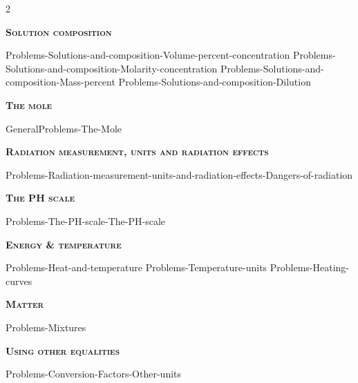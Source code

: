 \documentclass[main.tex]{subfiles}
\begin{document}
\newpage
\fancyhfoffset[E,O]{0pt}
\setlength{\columnsep}{30pt}
\begin{conclusion}
\end{conclusion}
\begin{multicols*}{2}\setcounter{numA}{1}  %










\newcommand\chapterlabel{ChMIX-statesofmatter}

{\raggedright\textsc{\textbf{Solution composition}}\par}
  \renewcommand\chapterlabel{Ch-electrolytes}
  {Problems-Solutions-and-composition-Volume-percent-concentration}
 {Problems-Solutions-and-composition-Molarity-concentration}
 {Problems-Solutions-and-composition-Mass-percent}
 {Problems-Solutions-and-composition-Dilution}
 
 {\raggedright\textsc{\textbf{The mole}}\par}
  \renewcommand\chapterlabel{Ch-mole}
 {GeneralProblems-The-Mole}

 {\raggedright\textsc{\textbf{Radiation measurement, units and radiation effects}}\par}
  \renewcommand\chapterlabel{Ch-nuclear}
{Problems-Radiation-measurement-units-and-radiation-effects-Dangers-of-radiation}

{\raggedright\textsc{\textbf{The PH scale}}\par}  \renewcommand\chapterlabel{Ch-acidbase}
 {Problems-The-PH-scale-The-PH-scale}

{\raggedright\textsc{\textbf{Energy \& temperature}}\par}\renewcommand\chapterlabel{Ch-thermochemistry}
{Problems-Heat-and-temperature}
 {Problems-Temperature-units}
\renewcommand\chapterlabel{Ch-solids}
 {Problems-Heating-curves}

{\raggedright\textsc{\textbf{Matter}}\par}\renewcommand\chapterlabel{Ch-measurements}
{Problems-Mixtures}

{\raggedright\textsc{\textbf{Using other equalities }}\par}\renewcommand\chapterlabel{Ch-measurements}
{Problems-Conversion-Factors-Other-units}

 
 

\end{multicols*}
\end{document}
